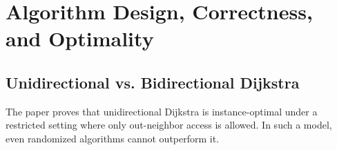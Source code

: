 \documentclass[12pt]{article}
\begin{document}


\section{Algorithm Design, Correctness, and Optimality}

\subsection{Unidirectional vs. Bidirectional Dijkstra}
The paper proves that unidirectional Dijkstra is instance-optimal under a restricted setting where only out-neighbor access is allowed. In such a model, even randomized algorithms cannot outperform it.
\end{document}
